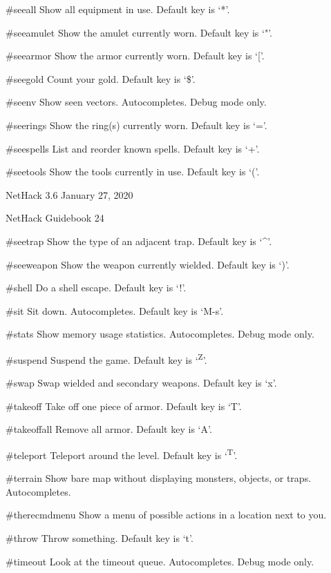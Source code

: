 \documentclass[11pt]{article}
\begin{document}
\#seeall
   Show all equipment in use. Default key is `*'.

\#seeamulet
   Show the amulet currently worn. Default key is `"'.

\#seearmor
   Show the armor currently worn. Default key is `['.

\#seegold
   Count your gold. Default key is `\$'.

\#seenv
   Show seen vectors. Autocompletes. Debug mode only.

\#seerings
   Show the ring(s) currently worn. Default key is `='.

\#seespells
   List and reorder known spells. Default key is `+'.

\#seetools
   Show the tools currently in use. Default key is `('.



NetHack 3.6                   January 27, 2020





NetHack Guidebook                       24



\#seetrap
   Show the type of an adjacent trap. Default key is `\^{}'.

\#seeweapon
   Show the weapon currently wielded. Default key is `)'.

\#shell
   Do a shell escape. Default key is `!'.

\#sit
   Sit down. Autocompletes. Default key is `M-s'.

\#stats
   Show memory usage statistics. Autocompletes. Debug mode
   only.

\#suspend
   Suspend the game. Default key is `\textsuperscript{Z}'.

\#swap
   Swap wielded and secondary weapons. Default key is `x'.

\#takeoff
   Take off one piece of armor. Default key is `T'.

\#takeoffall
   Remove all armor. Default key is `A'.

\#teleport
   Teleport around the level. Default key is `\textsuperscript{T}'.

\#terrain
   Show bare map without displaying monsters, objects, or
   traps. Autocompletes.

\#therecmdmenu
   Show a menu of possible actions in a location next to you.

\#throw
   Throw something. Default key is `t'.

\#timeout
   Look at the timeout queue. Autocompletes. Debug mode only.
\end{document}

